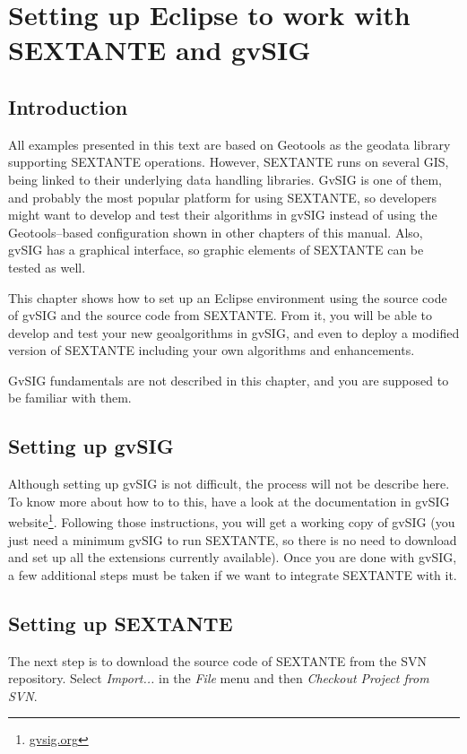 \chapter{Setting up Eclipse to work with SEXTANTE and gvSIG}

\section{Introduction}

All examples presented in this text are based on Geotools as the geodata library supporting SEXTANTE operations. However, SEXTANTE runs on several GIS, being linked to their underlying data handling libraries. GvSIG is one of them, and probably the most popular platform for using SEXTANTE, so developers might want to develop and test their algorithms in gvSIG instead of using the Geotools--based configuration shown in other chapters of this manual. Also, gvSIG has a graphical interface, so graphic elements of SEXTANTE can be tested as well.

This chapter shows how to set up an Eclipse environment using the source code of gvSIG and the source code from SEXTANTE. From it, you will be able to develop and test your new geoalgorithms in gvSIG, and even to deploy a modified version of SEXTANTE including your own algorithms and enhancements.

GvSIG fundamentals are not described in this chapter, and you are supposed to be familiar with them.

\section{Setting up gvSIG}

Although setting up gvSIG is not difficult, the process will not be describe here. To know more about how to to this, have a look at the documentation in gvSIG website\footnote{\url{gvsig.org}}. Following those instructions, you will get a working copy of gvSIG (you just need a minimum gvSIG to run SEXTANTE, so there is no need to download and set up all the extensions currently available). Once you are done with gvSIG, a few additional steps must be taken if we want to integrate SEXTANTE with it. 

\section{Setting up SEXTANTE}

The next step is to download the source code of SEXTANTE from the SVN repository. Select \emph{Import...} in the \emph{File} menu and then \emph{Checkout Project from SVN}.

